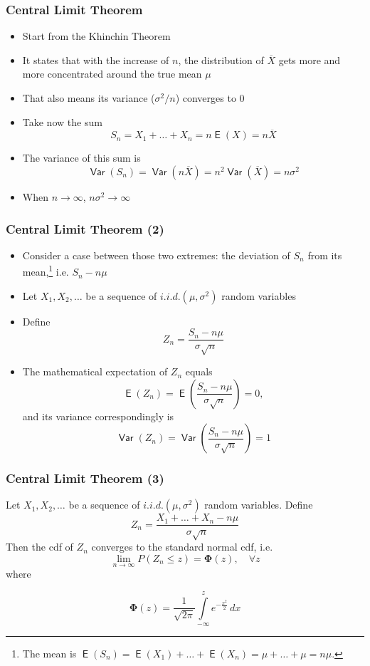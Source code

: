 \documentclass[10pt]{beamer}
\DeclareMathOperator{\E}{\mathsf{E}}
\DeclareMathOperator{\var}{\mathsf{Var}}
\theoremstyle{definition}
\begin{document}
\begin{frame}[fragile]
	\frametitle{Central Limit Theorem}
	\begin{itemize}
		\item Start from the Khinchin Theorem
		
		\item It states that with the increase of $ n $, the distribution of $ \overline X $ gets more and more concentrated around the true mean $ \mu $
		
		\item That also means its variance ($ \sigma^{2}/n $) converges to 0
		
		\item Take now the sum
		\[
			S_{n} = X_{1} + \ldots + X_{n} = n\E(X) = n\overline{X}
		\]
		
		\item The variance of this sum is
		\[
			\var(S_{n}) = \var(n\overline{X}) = n^{2}\var(\overline{X}) = n\sigma^{2}
		\]
		
		\item When $ n \to \infty $, $ n\sigma^{2} \to \infty $
	\end{itemize}
\end{frame}

\begin{frame}[fragile]
	\frametitle{Central Limit Theorem (2)}
	\begin{itemize}
		\item Consider a case between those two extremes: the deviation of $ S_{n} $ from its mean,\footnote{The mean is $ \E(S_{n}) = \E(X_{1}) + \ldots + \E(X_{n}) = \mu + \ldots + \mu = n\mu $.} i.e. $ S_{n} - n\mu $
		
		\item Let $ X_{1}, X_{2}, \ldots $ be a sequence of $ i.i.d.(\mu, \sigma^{2}) $ random variables
		
		\item Define 
		\[
			Z_{n} = \dfrac{S_{n} - n\mu}{\sigma\sqrt{n}}
		\]
		
		\item The mathematical expectation of $ Z_{n} $ equals
		\[
			\E(Z_{n}) = \E\left(\dfrac{S_{n} - n\mu}{\sigma\sqrt{n}}\right) = 0,
		\]
		and its variance correspondingly is
		\[
			\var(Z_{n}) = \var\left(\dfrac{S_{n} - n\mu}{\sigma\sqrt{n}}\right) = 1
		\]
	\end{itemize}
\end{frame}

\begin{frame}[fragile]
	\frametitle{Central Limit Theorem (3)}
	\begin{theorem}
		Let $ X_{1}, X_{2}, \ldots $ be a sequence of $ i.i.d.(\mu, \sigma^{2}) $ random variables. Define
		\[
			Z_{n} = \dfrac{X_{1} + \ldots + X_{n} - n\mu}{\sigma\sqrt{n}}
		\]
		Then the cdf of $ Z_{n} $ converges to the standard normal cdf, i.e. 
		\[
			\lim_{n\to\infty} P(Z_{n}\leq z) = \boldsymbol\Phi(z), \quad \forall z
		\]
		where
		
		\[
			\boldsymbol \Phi(z) = \dfrac{1}{\sqrt{2\pi}}\int\limits_{-\infty}^{z} e^{-\frac{x^{2}}{2}}\, dx
		\]
	\end{theorem}
\end{frame}
\end{document}
